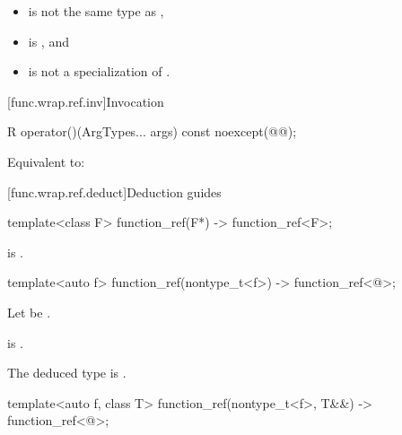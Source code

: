 \begin{itemdescr}
\pnum
\constraints
\begin{itemize}
\item {} is not the same type as ,
\item {} is , and
\item {} is not a specialization of .
\end{itemize}
\end{itemdescr}

[func.wrap.ref.inv]{Invocation}

%
\begin{itemdecl}
R operator()(ArgTypes... args) const noexcept(@@);
\end{itemdecl}

\begin{itemdescr}
\pnum
\effects
Equivalent to:
\end{itemdescr}

[func.wrap.ref.deduct]{Deduction guides}

\begin{itemdecl}
template<class F>
  function_ref(F*) -> function_ref<F>;
\end{itemdecl}

\begin{itemdescr}
\pnum
\constraints
{} is .
\end{itemdescr}

\begin{itemdecl}
template<auto f>
  function_ref(nontype_t<f>) -> function_ref<@\seebelow@>;
\end{itemdecl}

\begin{itemdescr}
\pnum
Let  be .

\pnum
\constraints
{} is .

\pnum
\remarks
The deduced type is .
\end{itemdescr}

\begin{itemdecl}
template<auto f, class T>
  function_ref(nontype_t<f>, T&&) -> function_ref<@\seebelow@>;
\end{itemdecl}

